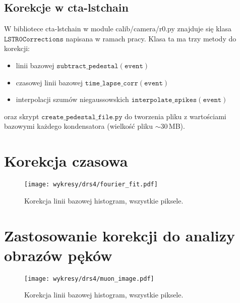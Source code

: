 \documentclass[a4paper,11pt,twoside]{article}
\begin{document}
\subsection{Korekcje w cta-lstchain}
W bibliotece cta-lstchain w module calib/camera/r0.py znajduje się klasa $\mathtt{LSTR0Corrections}$ napisana w ramach pracy. Klasa ta ma trzy metody do korekcji:
\begin{itemize}
\item linii bazowej $\mathtt{subtract\_pedestal(event)}$
\item czasowej linii bazowej $\mathtt{time\_lapse\_corr(event)}$
\item interpolacji szumów niegaussowskich $\mathtt{interpolate\_spikes(event)}$
\end{itemize}
oraz skrypt $\mathtt{create\_pedestal\_file.py}$ do tworzenia pliku z wartościami bazowymi każdego kondensatora (wielkość pliku $\sim$30\,MB).
\newpage
\section{Korekcja czasowa}
\begin{figure}[H] 
\centering
\texttt{[image: wykresy/drs4/fourier\_fit.pdf]}
\caption{Korekcja linii bazowej histogram, wszystkie piksele.}
\label{fig:fourier_fit}
\end{figure}
\newpage
\section{Zastosowanie korekcji do analizy obrazów pęków}
\begin{figure}[H] 
\centering
\texttt{[image: wykresy/drs4/muon\_image.pdf]}
\caption{Korekcja linii bazowej histogram, wszystkie piksele.}
\label{fig:muon_image}
\end{figure}
\end{document}

